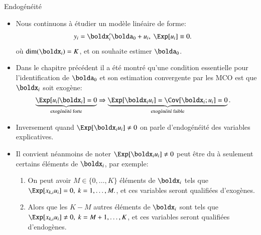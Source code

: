 \begin{frame}[allowframebreaks]{Endogénéité}
\begin{itemize}
\item Nous continuons à étudier un modèle linéaire de forme: 
\begin{align*}
    y_i &=\boldx_i^\prime\bolda_0 + u_i, \ \Exp[u_i]\equiv 0.
\end{align*}
où $\dim(\boldx_i) = K$, et on souhaite estimer $\bolda_0$.
\item Dans le chapitre précédent il a été montré qu'une condition essentielle 
pour l'identification  de $\bolda_0$ et son estimation convergente par les MCO est que  $\boldx_i$ 
soit exogène:
\begin{align*}
 \underbrace{\Exp[u_i|\boldx_i] = 0}_{\text{exogénéité forte}} &\Rightarrow
 \underbrace{\Exp[\boldx_iu_i] = \Cov[\boldx_i; u_i] = 0}_{\text{exogénéité faible}}.
\end{align*}
\item Inversement quand $\Exp[\boldx_iu_i] \neq 0$ on parle d'endogénéité des variables explicatives.
\item Il convient néanmoins de noter $\Exp[\boldx_iu_i] \neq 0$ peut être du à seulement 
certains éléments de $\boldx_i$, par exemple:
\begin{enumerate}[$\star$]
\item On peut avoir $M\in\{0, \ldots, K\}$ éléments de $\boldx_i$ tels que $\Exp[x_{k, i}u_i] = 0, \ k = 1, \ldots, M.$, 
et ces variables seront qualifiées d'exogènes.
\item Alors que les $K-M$ autres éléments de $\boldx_i$ sont tels que  $\Exp[x_{k, i}u_i] \neq 0 , \ k = M + 1, \ldots, K$,
et ces variables seront qualifiées d'endogènes.
\end{enumerate}

\end{itemize}
\end{frame}
